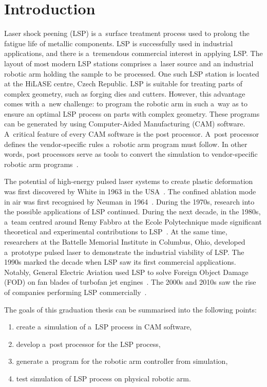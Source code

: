 \chapter{Introduction \label{ch:uvod}}




Laser shock peening (LSP) is a~surface treatment process used to prolong the fatigue life of metallic components. LSP is successfully used in industrial applications, and there is a~tremendous commercial interest in applying LSP. The layout of most modern LSP stations comprises a~laser source and an industrial robotic arm holding the sample to be processed. One such LSP station is located at the HiLASE centre, Czech Republic. LSP is suitable for treating parts of complex geometry, such as forging dies and cutters. However, this advantage comes with a~new challenge: to program the robotic arm in such a~way as to ensure an optimal LSP process on parts with complex geometry. These programs can be generated by using Computer-Aided Manufacturing (CAM) software. A~critical feature of every CAM software is the post processor. A~post processor defines the vendor-specific rules a~robotic arm program must follow.  In other words, post processors serve as tools to convert the simulation to vendor-specific robotic arm programs~\cite{ding_ye_2006}.

The potential of high-energy pulsed laser systems to create plastic deformation was first discovered by White in 1963 in the USA~\cite{white_1963}. The confined ablation mode in air was first recognised by Neuman in 1964~\cite{neuman_1964}. During the 1970s, research into the possible applications of LSP continued. During the next decade, in the 1980s, a~team centred around Remy Fabbro at the Ecole Polytechnique made significant theoretical and experimental contributions to LSP~\cite{fabbro_fournier_ballard_devaux_virmont_1990}. At the same time, researchers at the Battelle Memorial Institute in Columbus, Ohio, developed a~prototype pulsed laser to demonstrate the industrial viability of LSP. The 1990s marked the decade when LSP saw its first commercial applications. Notably, General Electric Aviation used LSP to solve Foreign Object Damage (FOD) on fan blades of turbofan jet engines~\cite{airforce}. The 2000s and 2010s saw the rise of companies performing LSP commercially~\cite{sano}.

The goals of this graduation thesis can be summarised into the following points:
\begin{enumerate}

    \item create a~simulation of a~LSP process in CAM software,
    \item develop a~post processor for the LSP process, 
    \item generate a~program  for the robotic arm controller from simulation,
    \item test simulation of LSP process on physical robotic arm.

    
\end{enumerate}


